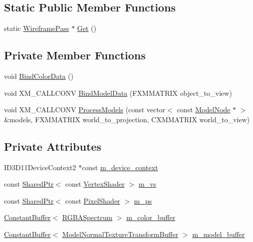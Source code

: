 \subsection*{Static Public Member Functions}
\begin{DoxyCompactItemize}
\item 
static \hyperlink{classmage_1_1_wireframe_pass}{Wireframe\+Pass} $\ast$ \hyperlink{classmage_1_1_wireframe_pass_ace5168eac9d32c1bfa71df3411960f48}{Get} ()
\end{DoxyCompactItemize}
\subsection*{Private Member Functions}
\begin{DoxyCompactItemize}
\item 
void \hyperlink{classmage_1_1_wireframe_pass_a574897c1274585057e8d44070409b7e3}{Bind\+Color\+Data} ()
\item 
void X\+M\+\_\+\+C\+A\+L\+L\+C\+O\+NV \hyperlink{classmage_1_1_wireframe_pass_a6e316eaabf3afb71162490c1f3c244f3}{Bind\+Model\+Data} (F\+X\+M\+M\+A\+T\+R\+IX object\+\_\+to\+\_\+view)
\item 
void X\+M\+\_\+\+C\+A\+L\+L\+C\+O\+NV \hyperlink{classmage_1_1_wireframe_pass_a190f6a6a916949b6b37d5b70c9451008}{Process\+Models} (const vector$<$ const \hyperlink{classmage_1_1_model_node}{Model\+Node} $\ast$ $>$ \&models, F\+X\+M\+M\+A\+T\+R\+IX world\+\_\+to\+\_\+projection, C\+X\+M\+M\+A\+T\+R\+IX world\+\_\+to\+\_\+view)
\end{DoxyCompactItemize}
\subsection*{Private Attributes}
\begin{DoxyCompactItemize}
\item 
I\+D3\+D11\+Device\+Context2 $\ast$const \hyperlink{classmage_1_1_wireframe_pass_aa3e85e2688c424fc369da6c00691d466}{m\+\_\+device\+\_\+context}
\item 
const \hyperlink{namespacemage_a1e01ae66713838a7a67d30e44c67703e}{Shared\+Ptr}$<$ const \hyperlink{classmage_1_1_vertex_shader}{Vertex\+Shader} $>$ \hyperlink{classmage_1_1_wireframe_pass_aa55de3b804055362812bcf775e0dffb4}{m\+\_\+vs}
\item 
const \hyperlink{namespacemage_a1e01ae66713838a7a67d30e44c67703e}{Shared\+Ptr}$<$ const \hyperlink{namespacemage_a27ecaf266420ee7a494d64edc0757129}{Pixel\+Shader} $>$ \hyperlink{classmage_1_1_wireframe_pass_a39577f12ad9b3f72e703c290cbf46002}{m\+\_\+ps}
\item 
\hyperlink{structmage_1_1_constant_buffer}{Constant\+Buffer}$<$ \hyperlink{structmage_1_1_r_g_b_a_spectrum}{R\+G\+B\+A\+Spectrum} $>$ \hyperlink{classmage_1_1_wireframe_pass_ab046a411db5ef3cd9c291ea1bea7cdbc}{m\+\_\+color\+\_\+buffer}
\item 
\hyperlink{structmage_1_1_constant_buffer}{Constant\+Buffer}$<$ \hyperlink{structmage_1_1_model_normal_texture_transform_buffer}{Model\+Normal\+Texture\+Transform\+Buffer} $>$ \hyperlink{classmage_1_1_wireframe_pass_aa7fb7cbba08fe8b4d7defab36d2e82a7}{m\+\_\+model\+\_\+buffer}
\end{DoxyCompactItemize}



